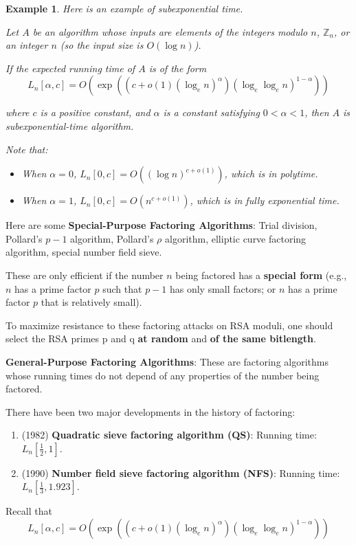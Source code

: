 \documentclass[12pt,titlepage]{article}
\newtheorem{protoexample}[prototheorem]{Example}
\newenvironment{example}
{\colorlet{shadecolor}{red!15}\begin{shaded}\begin{protoexample}\normalfont}{\end{protoexample}\end{shaded}}
\begin{document}
\begin{example}
	Here is an example of subexponential time. 

	Let $A$ be an algorithm whose inputs are elements of the integers modulo $n$, $\mathbb{Z}_n$, or an integer $n$ (so the input size is $O(\log n)$).

	If the expected running time of $A$ is of the form $$L_n[\alpha, c] = O(\exp((c + o(1)(\log_e n)^\alpha)(\log_e\log_en)^{1-\alpha}))$$

	where $c$ is a positive constant, and $\alpha$ is a constant satisfying $0 < \alpha < 1$, then $A$ is subexponential-time algorithm. 

	Note that: \begin{itemize}
		\item When $\alpha = 0$, $L_n[0, c] = O((\log n)^{c + o(1)})$, which is in polytime. 
		\item When $\alpha = 1$, $L_n[0, c] = O(n^{c+o(1)})$, which is in fully exponential time. 
	\end{itemize}
\end{example}

Here are some \textbf{Special-Purpose Factoring Algorithms}: Trial division, Pollard’s $p-1$ algorithm, Pollard’s $\rho$ algorithm, elliptic curve factoring algorithm, special number field sieve.

These are only efficient if the number $n$ being factored has a \textbf{special form} (e.g., $n$ has a prime factor $p$ such that $p - 1$ has only small factors; or $n$ has a prime factor $p$ that is relatively small).

To maximize resistance to these factoring attacks on RSA moduli, one should select the RSA primes p and q \textbf{at random} and \textbf{of the same bitlength}.

\textbf{General-Purpose Factoring Algorithms}: These are factoring algorithms whose running times do not depend of any properties of the number being factored.

There have been two major developments in the history of factoring:
\begin{enumerate}
	\item (1982) \textbf{Quadratic sieve factoring algorithm (QS)}: Running time: $L_n [\frac{1}{2}, 1]$.
	\item (1990) \textbf{Number field sieve factoring algorithm (NFS)}: Running time: $L_n [\frac{1}{3}, 1.923]$.
\end{enumerate}

Recall that $$L_n[\alpha, c] = O(\exp((c + o(1)(\log_e n)^\alpha)(\log_e\log_en)^{1-\alpha}))$$
\end{document}
